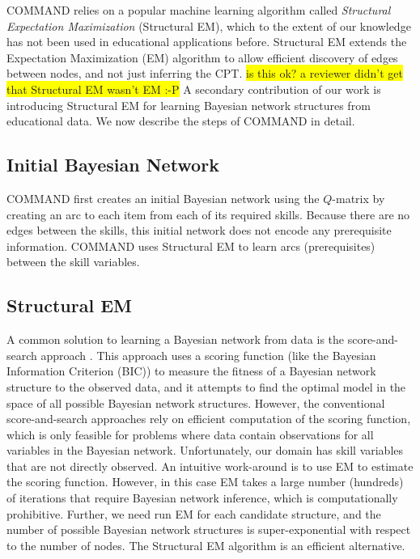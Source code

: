 \documentclass{edm_template}
\newcommand{\hl}[1]{\colorbox{yellow}{#1}}
\begin{document}
COMMAND relies on a popular machine learning algorithm called \textit{Structural Expectation Maximization} (Structural EM), which to the extent of our knowledge has not been used in educational applications before. 
Structural EM extends the Expectation Maximization (EM) algorithm to allow efficient discovery of edges between nodes, and not just inferring the CPT. \hl{is this ok? a reviewer didn't get that Structural EM wasn't EM :-P}
A secondary contribution of our work is introducing Structural EM for learning Bayesian network structures from educational data.
We now describe the  steps of COMMAND in detail.

\subsection{Initial Bayesian Network}
\label{sec:initial_bn}
COMMAND first creates an initial Bayesian network using the  $Q$-matrix
by creating an arc to each item from each of its required skills.
Because there are no edges between the skills, this  initial network does not encode any prerequisite information.
COMMAND uses Structural EM to learn arcs  (prerequisites) between the skill variables.

\subsection{Structural EM}
\label{sec:sem}

A common solution to learning a Bayesian network from data is the score-and-search approach \cite{cooper1992bayesian,heckerman1997bayesian}.
This approach uses a scoring function (like  the Bayesian Information Criterion (BIC)) to measure the fitness of a Bayesian network structure to the observed data, 
and it attempts to find the optimal model in the space of all possible Bayesian network structures.
However, the conventional score-and-search approaches rely on efficient computation of the scoring function, 
which is only feasible for problems where data contain observations for all variables in the Bayesian network.
Unfortunately, our domain has skill variables that are not directly observed.
An intuitive work-around is to use EM  to estimate the scoring function.
However, in this case EM takes a large number (hundreds) of iterations that require Bayesian network inference, which is computationally prohibitive.
Further, we need run EM for each candidate structure, and the number of possible Bayesian network structures is super-exponential with respect to the number of nodes.
The Structural EM algorithm \cite{friedman1997learning} is an efficient alternative.
\end{document}
